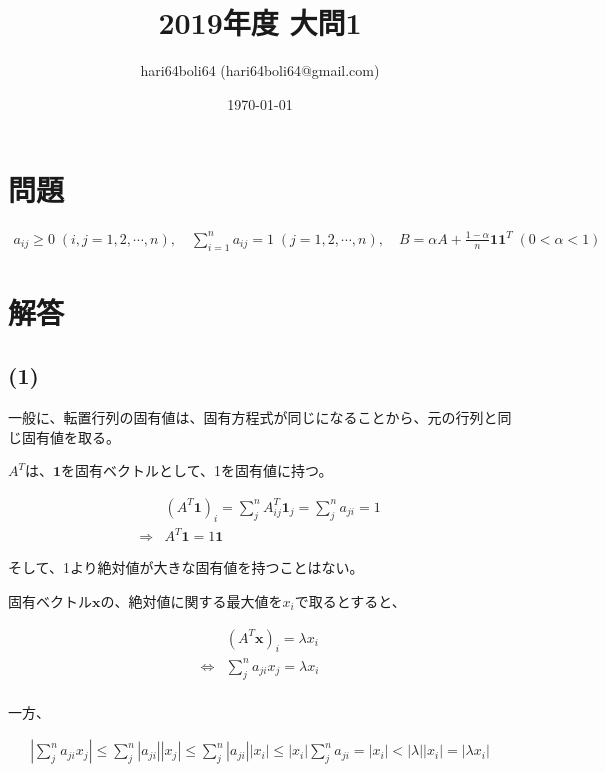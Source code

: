\documentclass[a4paper, 10pt, dvipdfmx]{jlreq}
\begin{document}
\title{2019年度 大問1}
\author{hari64boli64 (hari64boli64@gmail.com)}
\date{\today}
\maketitle


\section{問題}

\begin{align*}
    a_{ij} \geq 0 \; (i,j = 1,2,\cdots,n), \quad \sum_{i=1}^{n}a_{ij}=1 \; (j=1,2,\cdots,n),  \quad B=\alpha A+\frac{1-\alpha}{n}\bm{1}\bm{1}^T \; (0<\alpha<1)
\end{align*}

\section{解答}

\subsection*{(1)}

一般に、転置行列の固有値は、固有方程式が同じになることから、元の行列と同じ固有値を取る。

$A^T$は、$\bm{1}$を固有ベクトルとして、1を固有値に持つ。

\begin{align*}
                & (A^T\bm{1})_i=\sum_{j}^n A^T_{ij}\bm{1}_j=\sum_{j}^na_{ji}=1 \\
    \Rightarrow & A^T\bm{1}=1\bm{1}
\end{align*}

そして、1より絶対値が大きな固有値を持つことはない。

固有ベクトル$\bm{x}$の、絶対値に関する最大値を$x_i$で取るとすると、

\begin{align*}
                    & (A^T\bm{x})_i =\lambda x_i        \\
    \Leftrightarrow & \sum_{j}^n a_{ji}x_j =\lambda x_i \\
\end{align*}

一方、

\begin{align*}
    \left|\sum_{j}^n a_{ji}x_j\right| \leq \sum_{j}^n |a_{ji}||x_j| \leq \sum_{j}^n |a_{ji}||x_i| \leq |x_i|\sum_{j}^n a_{ji} = |x_i| < |\lambda||x_i|=|\lambda x_i|
\end{align*}
\end{document}
